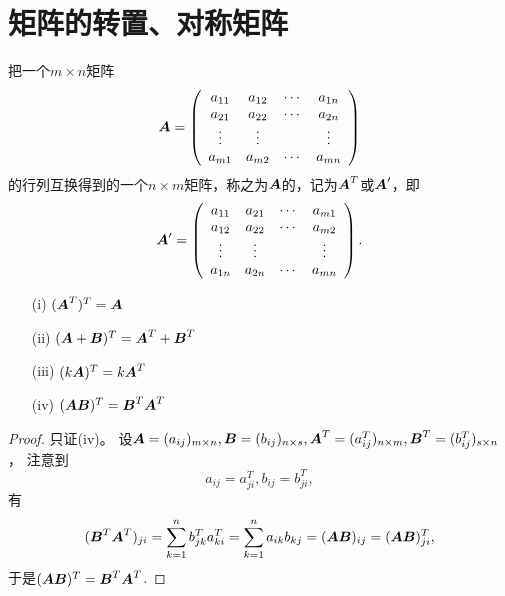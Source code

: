 \section{矩阵的转置、对称矩阵}

\begin{dingyi}[转置矩阵]
  把一个$m\times n$矩阵
  $$
  \boldsymbol{A} = \left(
    \begin{array}{cccc}
      a_{11} & a_{12} & \cdots & a_{1n} \\
      a_{21} & a_{22} & \cdots & a_{2n} \\
      \vdots   & \vdots &  & \vdots \\
      a_{m1} & a_{m2} & \cdots & a_{mn} 
    \end{array}
  \right)
  $$
  的行列互换得到的一个$n\times m$矩阵，称之为$\boldsymbol{A}$的，记为$\boldsymbol{A}^T$或$\boldsymbol{A}^\prime$，即
  $$
  \boldsymbol{A}^\prime = \left(
    \begin{array}{cccc}
      a_{11} & a_{21} & \cdots & a_{m1} \\
      a_{12} & a_{22} & \cdots & a_{m2} \\
      \vdots   & \vdots &  & \vdots \\
      a_{1n} & a_{2n} & \cdots & a_{mn} 
    \end{array}
  \right).
  $$  
\end{dingyi}

\begin{dingli}[矩阵转置的运算律]
  \begin{itemize}
  \item[(i)] $(\boldsymbol{A}^T)^T=\boldsymbol{A}$
  \item[(ii)] $(\boldsymbol{A}+\boldsymbol{B})^T=\boldsymbol{A}^T+\boldsymbol{B}^T$
  \item[(iii)] $(k\boldsymbol{A})^T= k\boldsymbol{A}^T$
  \item[(iv)] $(\boldsymbol{A}\boldsymbol{B})^T=\boldsymbol{B}^T\boldsymbol{A}^T$
  \end{itemize}
\end{dingli}

\begin{proof}
  只证(iv)。 设$\boldsymbol{A}=(a_{ij})_{m\times n}, \boldsymbol{B}=(b_{ij})_{n\times s}, \boldsymbol{A}^T=(a_{ij}^T)_{n\times m}, \boldsymbol{B}^T=(b_{ij}^T)_{s\times n}$，
  注意到
  $$a_{ij} = a_{ji}^T, b_{ij} = b_{ji}^T,$$  
  有
  $$
  (\boldsymbol{B}^T\boldsymbol{A}^T)_{ji} = \sum_{k=1}^n b_{jk}^Ta_{ki}^T  = \sum_{k=1}^n a_{ik}b_{kj}  = (\boldsymbol{A}\boldsymbol{B})_{ij}  = (\boldsymbol{A}\boldsymbol{B})_{ji}^T,
  $$ 
  于是$(\boldsymbol{A}\boldsymbol{B})^T=\boldsymbol{B}^T\boldsymbol{A}^T$.
\end{proof}





